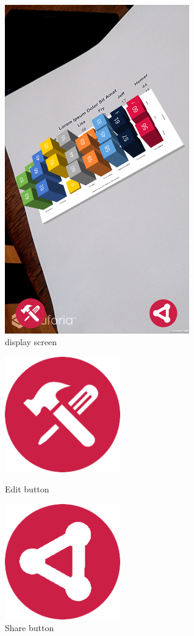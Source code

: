 \documentclass[a4paper,12pt]{article}
\begin{document}
\begin{figure}[H]
\centering
	\includegraphics[width=8cm]{images/graph.png}
	\caption{display screen \label{overflow}}
\end{figure}

\begin{figure}[H]
  \centering
  \begin{minipage}[b]{0.4\textwidth}
    \includegraphics[width=50mm]{images/editRed.png}
    \caption{Edit button}
  \end{minipage}
  \hfill
  \begin{minipage}[b]{0.4\textwidth}
    \includegraphics[width=50mm]{images/shareRed.png}
    \caption{Share button}
  \end{minipage}
\end{figure}
\newpage
\end{document}
